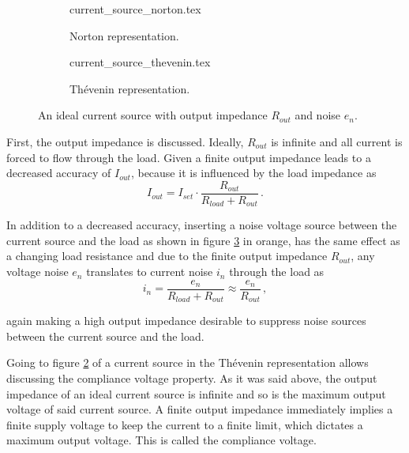 \begin{figure}[ht]
    \centering
    \begin{subfigure}{0.4\linewidth}
        \centering
        {current_source_norton.tex}
        \caption{Norton representation.}
        \label{fig:ideal_current_source_norton}
    \end{subfigure}
    \begin{subfigure}{0.4\linewidth}
        \centering
        {current_source_thevenin.tex}
        \caption{Thévenin representation.}
        \label{fig:ideal_current_source_thevenin}
    \end{subfigure}
    \caption{An ideal current source with output impedance $R_{out}$ and noise $e_n$.}
    \label{fig:ideal_current_source}
\end{figure}

First, the output impedance is discussed. Ideally, $R_{out}$ is infinite and all current is forced to flow through the load. Given a finite output impedance leads to a decreased accuracy of $I_{out}$, because it is influenced by the load impedance as
\begin{equation}
    I_{out} = I_{set} \cdot \frac{R_{out}}{R_{load} + R_{out}} \, .
\end{equation}

In addition to a decreased accuracy, inserting a noise voltage source between the current source and the load as shown in figure \ref{fig:ideal_current_source} in orange, has the same effect as a changing load resistance and due to the finite output impedance $R_{out}$, any voltage noise $e_n$ translates to current noise $i_n$ through the load as
\begin{equation}
    i_n = \frac{e_n}{R_{load} + R_{out}} \approx \frac{e_n}{R_{out}} \, ,
\end{equation}

again making a high output impedance desirable to suppress noise sources between the current source and the load.

Going to figure \ref{fig:ideal_current_source_thevenin} of a current source in the Thévenin representation allows discussing the compliance voltage property. As it was said above, the output impedance of an ideal current source is infinite and so is the maximum output voltage of said current source. A finite output impedance immediately implies a finite supply voltage to keep the current to a finite limit, which dictates a maximum output voltage. This is called the compliance voltage.

